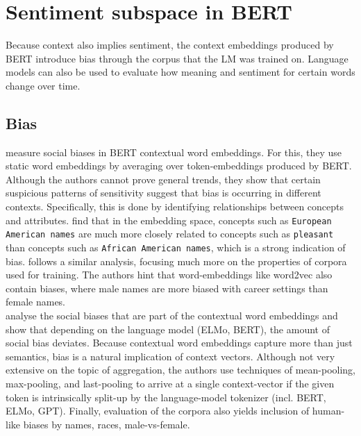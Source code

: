 \documentclass[a4paper,12pt,oneside,openright]{report}
\begin{document}

\section{Sentiment subspace in BERT}

Because context also implies sentiment, the context embeddings produced by BERT introduce bias through the corpus that the LM was trained on.
Language models can also be used to evaluate how meaning and sentiment for certain words change over time.

\subsection{Bias} 

\cite{may19} measure social biases in BERT contextual word embeddings.
For this, they use static word embeddings by averaging over token-embeddings produced by BERT.
Although the authors cannot prove general trends, they show that certain suspicious patterns of sensitivity suggest that bias is occurring in different contexts.
Specifically, this is done by identifying relationships between concepts and attributes. 
\cite{may19, caliskan19} find that in the embedding space, concepts such as \texttt{European American names} are much more closely related to concepts such as \texttt{pleasant} than concepts such as \texttt{African American names}, which is a strong indication of bias.
\cite{caliskan19} follows a similar analysis, focusing much more on the properties of corpora used for training.
The authors hint that word-embeddings like word2vec also contain biases, where male names are more biased with career settings than female names. \\

\cite{may19} analyse the social biases that are part of the contextual word embeddings and show that depending on the language model (ELMo, BERT), the amount of social bias deviates. 
Because contextual word embeddings capture more than just semantics, bias is a natural implication of context vectors.
Although not very extensive on the topic of aggregation, the authors use techniques of mean-pooling, max-pooling, and last-pooling to arrive at a single context-vector if the given token is intrinsically split-up by the language-model tokenizer (incl. BERT, ELMo, GPT).
Finally, evaluation of the corpora also yields inclusion of human-like biases \cite{jentzsch19} by names, races, male-vs-female.
\end{document}
